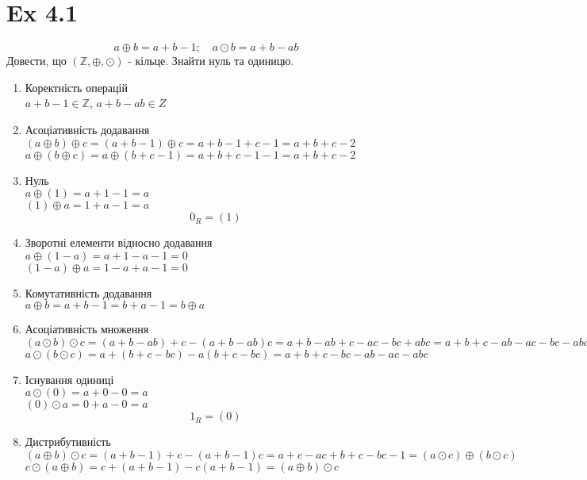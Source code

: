 \documentclass[11pt, a4paper]{article} %
\newcommand{\Z}{\mathbb{Z}}
\begin{document}
\section*{Ex 4.1}
\begin{mdframed}
    \[a\oplus b = a+b-1; \quad a\odot b = a+b-ab\]
    Довести, що $(\Z, \oplus, \odot)$ - кільце. Знайти нуль та одиницю.
\end{mdframed}

\begin{enumerate}
    \item Коректність операцій\\
        $a+b-1 \in \Z$, $a+b-ab \in Z$
    \item Асоціативність додавання\\
        $(a\oplus b) \oplus c = (a+b-1) \oplus c = a+b-1 + c - 1 = a+b+c-2$\\
        $a \oplus (b\oplus c) = a \oplus (b+c-1) = a+b+c-1-1 = a+b+c-2$
    \item Нуль\\
        $a \oplus (1) = a+1-1 = a$\\
        $(1) \oplus a = 1+a-1 = a$\\
        \[0_R = (1)\]
    \item Зворотні елементи відносно додавання\\
        $a\oplus (1-a) = a+1-a-1 = 0$\\
        $(1-a)\oplus a = 1-a+a-1 = 0$
    \item Комутативність додавання\\
        $a \oplus b = a+b-1 = b+a-1 = b\oplus a$
    \item Асоціативність множення\\
        $(a\odot b) \odot c = (a+b-ab)+c-(a+b-ab)c = a+b-ab+c-ac-bc+abc = a+b+c-ab-ac-bc-abc$\\
        $a\odot (b \odot c) = a + (b+c-bc) - a(b+c-bc) = a+b+c-bc-ab-ac-abc$
    \item Існування одиниці\\
        $a\odot (0) = a+0-0 = a$\\
        $(0) \odot a = 0+a-0 = a$
        \[1_R = (0)\]
    \item Дистрибутивність\\
        $(a\oplus b)\odot c = (a+b-1) + c - (a+b-1)c = a+c-ac +b+c-bc -1 = (a\odot c) \oplus (b\odot c)$\\
        $c\odot (a\oplus b) = c + (a+b-1) - c(a+b-1) = (a\oplus b)\odot c$
\end{enumerate}
\end{document}
